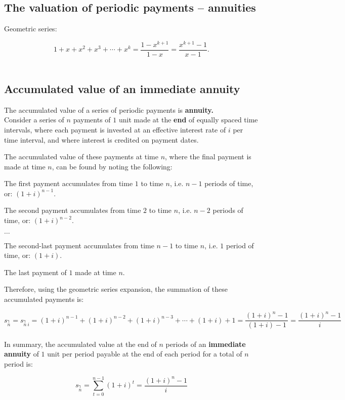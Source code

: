 \documentclass[a4paper, 11pt, twoside]{article}
\begin{document}
\subsection{The valuation of periodic payments -- annuities}

Geometric series:

\[1+x+x^2+x^3+\cdots + x^k = \frac{1-x^{k+1}}{1-x}=\frac{x^{k+1}-1}{x-1}.\]\\

\subsection{Accumulated value of an immediate annuity}

The accumulated value of a series of periodic payments is \textbf{annuity.}\\

Consider a series of $n$ payments of $1$ unit made at the \textbf{end} of equally spaced time intervals, where each payment is invested at an effective interest rate of $i$ per time interval, and where interest is credited on payment dates.

The accumulated value of these payments at time $n$, where the final payment is made at time $n$, can be found by noting the following:

The first payment accumulates from time $1$ to time $n$, i.e. $n-1$ periods of time, or: $(1+i)^{n-1}.$

The second payment accumulates from time $2$ to time $n$, i.e. $n-2$ periods of time, or: $(1+i)^{n-2}.$

$\dots$

The second-last payment accumulates from time $n-1$ to time $n$, i.e. $1$ period of time, or: $(1+i).$

The last payment of $1$ made at time $n.$

Therefore, using the geometric series expansion, the summation of these accumulated payments is:

\[s_{\annuity{n}}=s_{\annuity{n}\ i}=(1+i)^{n-1}+(1+i)^{n-2}+(1+i)^{n-3}+\cdots + (1+i)+1=\frac{(1+i)^n-1}{(1+i)-1}=\frac{(1+i)^n-1}{i}\]\\

In summary, the accumulated value at the end of $n$ periods of an \textbf{immediate annuity} of $1$ unit per period payable at the end of each period for a total of $n$ period is:

\[s_{\annuity{n}}=\sum^{n-1}_{t=0}(1+i)^t=\frac{(1+i)^n-1}{i}\]\\
\end{document}
